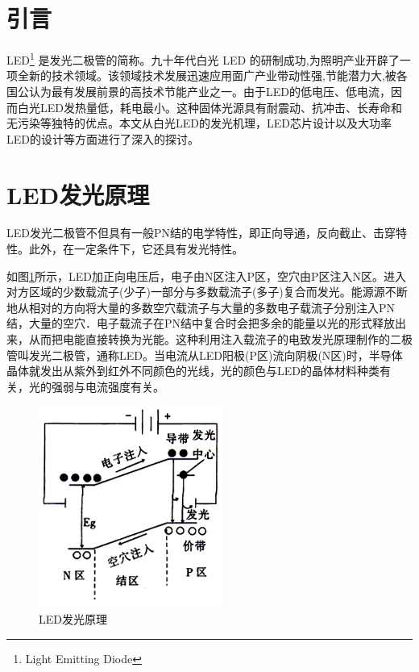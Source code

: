 \section{引言}

\CJKindent LED\footnote{Light Emitting Diode} 是发光二极管的简称。九十年代白光 LED 的研制成功,为照明产业开辟了一项全新的技术领域。该领域技术发展迅速应用面广产业带动性强,节能潜力大,被各国公认为最有发展前景的高技术节能产业之一。由于LED的低电压、低电流，因而白光LED发热量低，耗电最小。这种固体光源具有耐震动、抗冲击、长寿命和无污染等独特的优点。本文从白光LED的发光机理，LED芯片设计以及大功率LED的设计等方面进行了深入的探讨。

\section{LED发光原理}

\CJKindent LED发光二极管不但具有一般PN结的电学特性，即正向导通，反向截止、击穿特性。此外，在一定条件下，它还具有发光特性。

\CJKindent 如图\ref{led1}所示，LED加正向电压后，电子由N区注入P区，空穴由P区注入N区。进入对方区域的少数载流子(少子)一部分与多数载流子(多子)复合而发光。能源源不断地从相对的方向将大量的多数空穴载流子与大量的多数电子载流子分别注入PN结，大量的空穴．电子载流子在PN结中复合时会把多余的能量以光的形式释放出来，从而把电能直接转换为光能。这种利用注入载流子的电致发光原理制作的二极管叫发光二极管，通称LED。当电流从LED阳极(P区)流向阴极(N区)时，半导体晶体就发出从紫外到红外不同颜色的光线，光的颜色与LED的晶体材料种类有关，光的强弱与电流强度有关。
\begin{figure}[h]
\centering
\includegraphics[scale=1]{led1}
\caption{LED发光原理}
\label{led1}
\end{figure}

